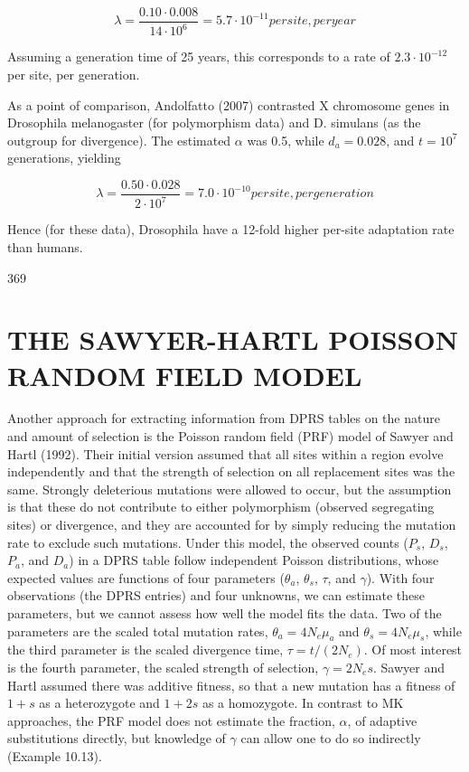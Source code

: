 \documentclass{article}
\begin{document}
\begin{equation}
\lambda=\frac{0.10\cdot0.008}{14\cdot10^{6}}=5.7\cdot10^{-11}per site,per year
\end{equation}

Assuming a generation time of 25 years, this corresponds to a rate of  $ 2.3 \cdot 10^{-12} $ per site, per generation.

As a point of comparison, Andolfatto (2007) contrasted X chromosome genes in Drosophila melanogaster (for polymorphism data) and D. simulans (as the outgroup for divergence). The estimated  $ \alpha $ was 0.5, while  $ d_a = 0.028 $, and  $ t = 10^7 $ generations, yielding

\begin{equation}
\lambda=\frac{0.50\cdot0.028}{2\cdot10^{7}}=7.0\cdot10^{-10}per site,per generation
\end{equation}

Hence (for these data), Drosophila have a 12-fold higher per-site adaptation rate than humans.

369

\section{THE SAWYER-HARTL POISSON RANDOM FIELD MODEL}
Another approach for extracting information from DPRS tables on the nature and amount of selection is the Poisson random field (PRF) model of Sawyer and Hartl (1992). Their initial version assumed that all sites within a region evolve independently and that the strength of selection on all replacement sites was the same. Strongly deleterious mutations were allowed to occur, but the assumption is that these do not contribute to either polymorphism (observed segregating sites) or divergence, and they are accounted for by simply reducing the mutation rate to exclude such mutations. Under this model, the observed counts ($P_s$, $D_s$, $P_a$, and $D_a$) in a DPRS table follow independent Poisson distributions, whose expected values are functions of four parameters ($\theta_a$, $\theta_s$, $\tau$, and $\gamma$). With four observations (the DPRS entries) and four unknowns, we can estimate these parameters, but we cannot assess how well the model fits the data. Two of the parameters are the scaled total mutation rates, $\theta_a = 4N_e\mu_a$ and $\theta_s = 4N_e\mu_s$, while the third parameter is the scaled divergence time, $\tau = t/(2N_e)$. Of most interest is the fourth parameter, the scaled strength of selection, $\gamma = 2N_e s$. Sawyer and Hartl assumed there was additive fitness, so that a new mutation has a fitness of $1 + s$ as a heterozygote and $1 + 2s$ as a homozygote. In contrast to MK approaches, the PRF model does not estimate the fraction, $\alpha$, of adaptive substitutions directly, but knowledge of $\gamma$ can allow one to do so indirectly (Example 10.13).
\end{document}
